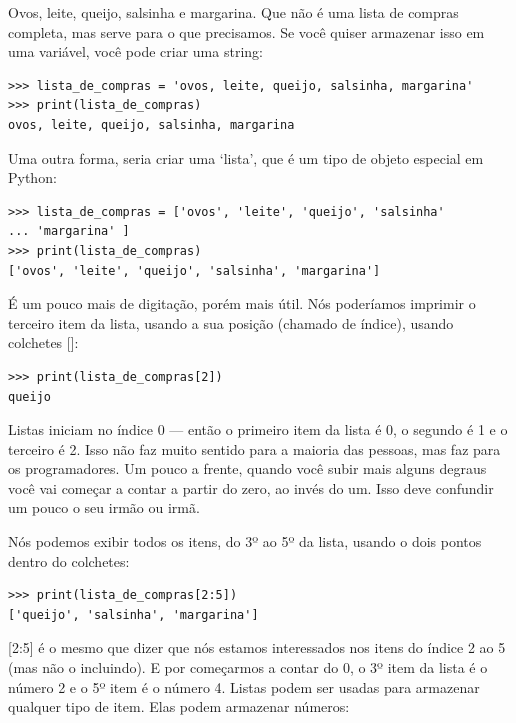 Ovos, leite, queijo, salsinha e margarina. Que não é uma lista de compras completa, mas serve para o que precisamos. Se você quiser armazenar isso em uma variável, você pode criar uma string:

\begin{listing}
\begin{verbatim}
>>> lista_de_compras = 'ovos, leite, queijo, salsinha, margarina'
>>> print(lista_de_compras)
ovos, leite, queijo, salsinha, margarina
\end{verbatim}
\end{listing}

Uma outra forma, seria criar uma `lista', que é um tipo de objeto especial em Python:

\begin{listing}
\begin{verbatim}
>>> lista_de_compras = ['ovos', 'leite', 'queijo', 'salsinha'
... 'margarina' ]
>>> print(lista_de_compras)
['ovos', 'leite', 'queijo', 'salsinha', 'margarina']
\end{verbatim}
\end{listing}

É um pouco mais de digitação, porém mais útil. Nós poderíamos imprimir o terceiro item da lista, usando a sua posição (chamado de índice), usando colchetes []:

\begin{listing}
\begin{verbatim}
>>> print(lista_de_compras[2])
queijo
\end{verbatim}
\end{listing}

Listas iniciam no índice 0 --- então o primeiro item da lista é 0, o segundo é 1 e o terceiro é 2. Isso não faz muito sentido para a maioria das pessoas, mas faz para os programadores. Um pouco a frente, quando você subir mais alguns degraus você vai começar a contar a partir do zero, ao invés do um. Isso deve confundir um pouco o seu irmão ou irmã.
\par
Nós podemos exibir todos os itens, do 3º ao 5º da lista, usando o dois pontos dentro do colchetes:

\begin{listing}
\begin{verbatim}
>>> print(lista_de_compras[2:5])
['queijo', 'salsinha', 'margarina']
\end{verbatim}
\end{listing}

[2:5] é o mesmo que dizer que nós estamos interessados nos itens do índice 2 ao 5 (mas não o incluindo). E por começarmos a contar do 0, o 3º item da lista é o número 2 e o 5º item é o número 4. Listas podem ser usadas para armazenar qualquer tipo de item. Elas podem armazenar números:

